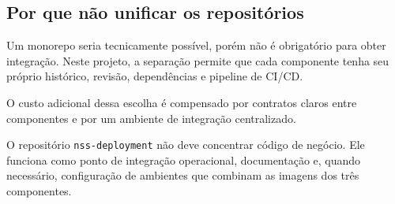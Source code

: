 \subsection{Por que não unificar os repositórios}

Um monorepo seria tecnicamente possível, porém não é obrigatório para obter integração. Neste projeto, a separação permite que cada componente tenha seu próprio histórico, revisão, dependências e pipeline de CI/CD.

O custo adicional dessa escolha é compensado por contratos claros entre componentes e por um ambiente de integração centralizado.

\begin{explicacao}
O repositório \texttt{nss-deployment} não deve concentrar código de negócio. Ele funciona como ponto de integração operacional, documentação e, quando necessário, configuração de ambientes que combinam as imagens dos três componentes.
\end{explicacao}
